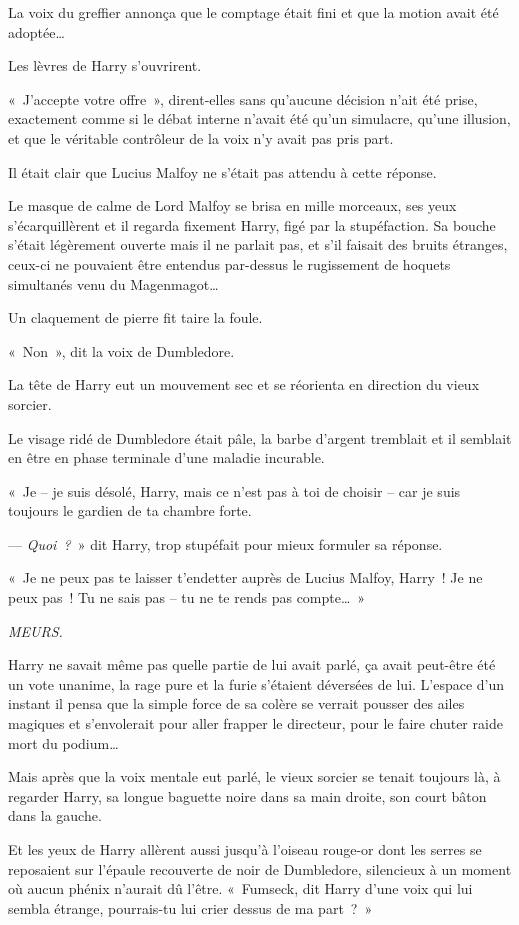 La voix du greffier annonça que le comptage était fini et que la motion avait été adoptée…

Les lèvres de Harry s'ouvrirent.

«~J'accepte votre offre~», dirent-elles sans qu'aucune décision n'ait été prise, exactement comme si le débat interne n'avait été qu'un simulacre, qu'une illusion, et que le véritable contrôleur de la voix n'y avait pas pris part.

Il était clair que Lucius Malfoy ne s'était pas attendu à cette réponse.

Le masque de calme de Lord Malfoy se brisa en mille morceaux, ses yeux s'écarquillèrent et il regarda fixement Harry, figé par la stupéfaction.
Sa bouche s'était légèrement ouverte mais il ne parlait pas, et s'il faisait des bruits étranges, ceux-ci ne pouvaient être entendus par-dessus le rugissement de hoquets simultanés venu du Magenmagot…

Un claquement de pierre fit taire la foule.

«~Non~», dit la voix de Dumbledore.

La tête de Harry eut un mouvement sec et se réorienta en direction du vieux sorcier.

Le visage ridé de Dumbledore était pâle, la barbe d'argent tremblait et il semblait en être en phase terminale d'une maladie incurable.

«~Je -- je suis désolé, Harry, mais ce n'est pas à toi de choisir -- car je suis toujours le gardien de ta chambre forte.

--- \emph{Quoi~?}~» dit Harry, trop stupéfait pour mieux formuler sa réponse.

«~Je ne peux pas te laisser t'endetter auprès de Lucius Malfoy, Harry~!
Je ne peux pas~!
Tu ne sais pas -- tu ne te rends pas compte…~»

\emph{MEURS.}

Harry ne savait même pas quelle partie de lui avait parlé, ça avait peut-être été un vote unanime, la rage pure et la furie s'étaient déversées de lui.
L'espace d'un instant il pensa que la simple force de sa colère se verrait pousser des ailes magiques et s'envolerait pour aller frapper le directeur, pour le faire chuter raide mort du podium…

Mais après que la voix mentale eut parlé, le vieux sorcier se tenait toujours là, à regarder Harry, sa longue baguette noire dans sa main droite, son court bâton dans la gauche.

Et les yeux de Harry allèrent aussi jusqu'à l'oiseau rouge-or dont les serres se reposaient sur l'épaule recouverte de noir de Dumbledore, silencieux à un moment où aucun phénix n'aurait dû l'être.
«~Fumseck, dit Harry d'une voix qui lui sembla étrange, pourrais-tu lui crier dessus de ma part~?~»

